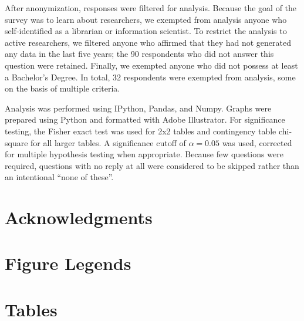 \documentclass[10pt]{article}
\begin{document}
After anonymization, responses were filtered for analysis.
Because the goal of the survey was to learn about researchers, we exempted from analysis anyone who self-identified as a librarian or information scientist.
To restrict the analysis to active researchers, we filtered anyone who affirmed that they had not generated any data in the last five years; the 90 respondents who did not answer this question were retained.
Finally, we exempted anyone who did not possess at least a Bachelor's Degree.
In total, 32 respondents were exempted from analysis, some on the basis of multiple criteria.

Analysis was performed using IPython\cite{perez_ipython_2007}, Pandas\cite{mckinney-proc-scipy-2010}, and Numpy\cite{van_der_walt_numpy_2011}.
Graphs were prepared using Python and formatted with Adobe Illustrator.
For significance testing, the Fisher exact test was used for 2x2 tables and contingency table chi-square for all larger tables.
A significance cutoff of $\alpha=0.05$ was used, corrected for multiple hypothesis testing when appropriate.
Because few questions were required, questions with no reply at all were considered to be skipped rather than an intentional ``none of these''.


\section*{Acknowledgments}




\section*{Figure Legends}


\section*{Tables}
\end{document}

